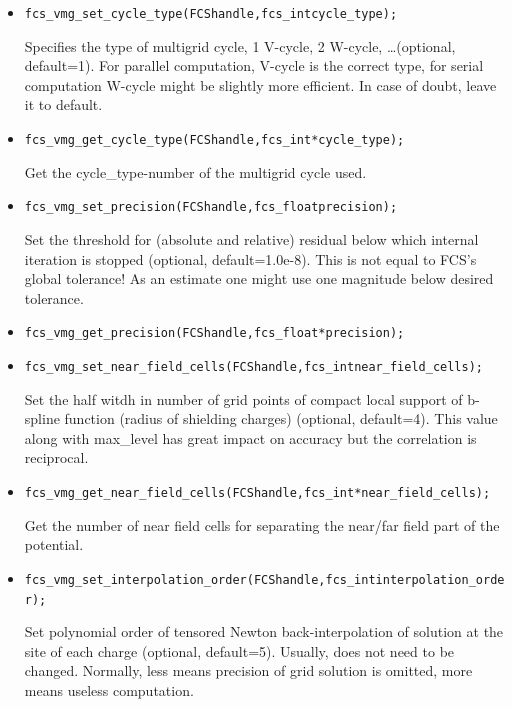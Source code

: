 \begin{itemize}
  \item
\begin{alltt}
fcs\_vmg\_set\_cycle\_type(FCS handle, fcs\_int cycle\_type);
\end{alltt}
Specifies the type of multigrid cycle, 1 V-cycle, 2 W-cycle, \ldots (optional, default=1).
For parallel computation, V-cycle is the correct type, for serial computation W-cycle might be slightly more efficient. In case of doubt, leave it to default.

  \item
\begin{alltt}
fcs\_vmg\_get\_cycle\_type(FCS handle, fcs\_int *cycle\_type);
\end{alltt}
Get the cycle\_type-number of the multigrid cycle used.

  \item
\begin{alltt}
fcs\_vmg\_set\_precision(FCS handle, fcs\_float precision);
\end{alltt}
Set the threshold for (absolute and relative) residual below which internal iteration is stopped (optional, default=1.0e-8).
This is not equal to FCS's global tolerance! As an estimate one might use one magnitude below desired tolerance.

  \item
\begin{alltt}
fcs\_vmg\_get\_precision(FCS handle, fcs\_float *precision);
\end{alltt}

  \item
\begin{alltt}
fcs\_vmg\_set\_near\_field\_cells(FCS handle, fcs\_int near\_field\_cells);
\end{alltt}
Set the half witdh in number of grid points of compact local support of b-spline function (radius of shielding charges) (optional, default=4).
This value along with max\_level has great impact on accuracy but the correlation is reciprocal.

  \item
\begin{alltt}
fcs\_vmg\_get\_near\_field\_cells(FCS handle, fcs\_int *near\_field\_cells);
\end{alltt}
Get the number of near field cells for separating the near/far field part of the potential.

  \item
\begin{alltt}
fcs\_vmg\_set\_interpolation\_order(FCS handle, fcs\_int interpolation\_order);
\end{alltt}
Set polynomial order of tensored Newton back-interpolation of solution at the site of each charge (optional, default=5).
Usually, does not need to be changed. Normally, less means precision of grid solution is omitted, more means useless computation.


\end{itemize}
